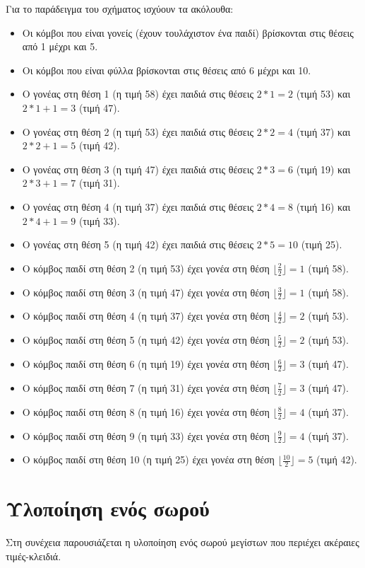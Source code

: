 Για το παράδειγμα του σχήματος ισχύουν τα ακόλουθα:
\begin{itemize}[nolistsep]
\item Οι κόμβοι που είναι γονείς (έχουν τουλάχιστον ένα παιδί) βρίσκονται στις θέσεις από 1 μέχρι και 5.
\item Οι κόμβοι που είναι φύλλα βρίσκονται στις θέσεις από 6 μέχρι και 10.
\item Ο γονέας στη θέση 1 (η τιμή 58) έχει παιδιά στις θέσεις $2*1=2$ (τιμή 53) και $2*1+1=3$ (τιμή 47).
\item Ο γονέας στη θέση 2 (η τιμή 53) έχει παιδιά στις θέσεις $2*2=4$ (τιμή 37) και $2*2+1=5$ (τιμή 42).
\item Ο γονέας στη θέση 3 (η τιμή 47) έχει παιδιά στις θέσεις $2*3=6$ (τιμή 19) και $2*3+1=7$ (τιμή 31).
\item Ο γονέας στη θέση 4 (η τιμή 37) έχει παιδιά στις θέσεις $2*4=8$ (τιμή 16) και $2*4+1=9$ (τιμή 33).
\item Ο γονέας στη θέση 5 (η τιμή 42) έχει παιδιά στις θέσεις $2*5=10$ (τιμή 25).
\item Ο κόμβος παιδί στη θέση 2 (η τιμή 53) έχει γονέα στη θέση $\lfloor{\frac{2}{2}}\rfloor=1$ (τιμή 58).
\item Ο κόμβος παιδί στη θέση 3 (η τιμή 47) έχει γονέα στη θέση $\lfloor{\frac{3}{2}}\rfloor=1$ (τιμή 58).
\item Ο κόμβος παιδί στη θέση 4 (η τιμή 37) έχει γονέα στη θέση $\lfloor{\frac{4}{2}}\rfloor=2$ (τιμή 53).
\item Ο κόμβος παιδί στη θέση 5 (η τιμή 42) έχει γονέα στη θέση $\lfloor{\frac{5}{2}}\rfloor=2$ (τιμή 53).
\item Ο κόμβος παιδί στη θέση 6 (η τιμή 19) έχει γονέα στη θέση $\lfloor{\frac{6}{2}}\rfloor=3$ (τιμή 47).
\item Ο κόμβος παιδί στη θέση 7 (η τιμή 31) έχει γονέα στη θέση $\lfloor{\frac{7}{2}}\rfloor=3$ (τιμή 47).
\item Ο κόμβος παιδί στη θέση 8 (η τιμή 16) έχει γονέα στη θέση $\lfloor{\frac{8}{2}}\rfloor=4$ (τιμή 37).
\item Ο κόμβος παιδί στη θέση 9 (η τιμή 33) έχει γονέα στη θέση $\lfloor{\frac{9}{2}}\rfloor=4$ (τιμή 37).
\item Ο κόμβος παιδί στη θέση 10 (η τιμή 25) έχει γονέα στη θέση $\lfloor{\frac{10}{2}}\rfloor=5$ (τιμή 42).
\end{itemize}

\section{Υλοποίηση ενός σωρού}
Στη συνέχεια παρουσιάζεται η υλοποίηση ενός σωρού μεγίστων που περιέχει ακέραιες τιμές-κλειδιά.


